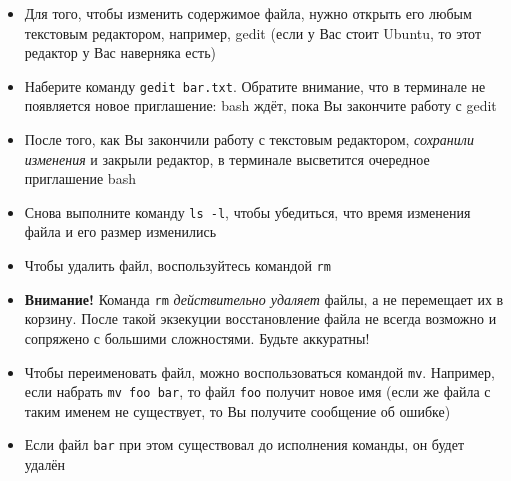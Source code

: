 \documentclass{beamer}
\begin{document}
\begin{frame}[fragile]

\end{frame}

\begin{frame}
	\begin{itemize}
		\item{Для того, чтобы изменить содержимое файла, нужно открыть его любым текстовым редактором, например, gedit (если у Вас стоит Ubuntu, то этот редактор у Вас наверняка есть)}%
		\item{Наберите команду \texttt{gedit bar.txt}. Обратите внимание, что в терминале не появляется новое приглашение: bash ждёт, пока Вы закончите работу с gedit}%
		\item{После того, как Вы закончили работу с текстовым редактором, \emph{сохранили изменения} и закрыли редактор, в терминале высветится очередное приглашение bash}%
		\item{Снова выполните команду \texttt{ls~-l}, чтобы убедиться, что время изменения файла и его размер изменились}
	\end{itemize}
\end{frame}

\begin{frame}
	\begin{itemize}
		\item{Чтобы удалить файл, воспользуйтесь командой \texttt{rm}}%
		\item{\textbf{Внимание!} Команда \texttt{rm} \emph{действительно удаляет} файлы, а не перемещает их в корзину. После такой экзекуции восстановление файла не всегда возможно и сопряжено с большими сложностями. Будьте аккуратны!}%
		\item{Чтобы переименовать файл, можно воспользоваться командой \texttt{mv}. Например, если набрать \texttt{mv~foo~bar}, то файл \texttt{foo} получит новое имя (если же файла с таким именем не существует, то Вы получите сообщение об ошибке)}%
		\item{Если файл \texttt{bar} при этом существовал до исполнения команды, он будет удалён}
	\end{itemize}
\end{frame}
\end{document}
